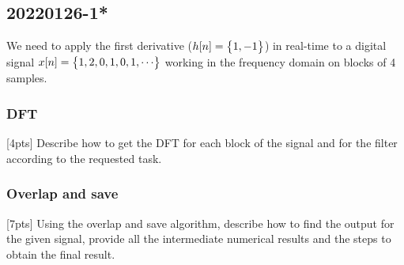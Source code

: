 \pagebreak\subsection{20220126-1*}
    We need to apply the first derivative ($h[n]=\begin{Bmatrix} {1,-1} \end{Bmatrix}$) in real-time to a digital signal $x[n]=\begin{Bmatrix} {1,2,0,1,0,1,\cdots} \end{Bmatrix}$ working in the frequency domain on blocks of 4 samples.

    \subsubsection{DFT}
    [4pts] Describe how to get the DFT for each block of the signal and for the filter according to the requested task.


    \subsubsection{Overlap and save}
    [7pts] Using the overlap and save algorithm, describe how to find the output for the given signal, provide all the intermediate numerical results and the steps to obtain the final result.

